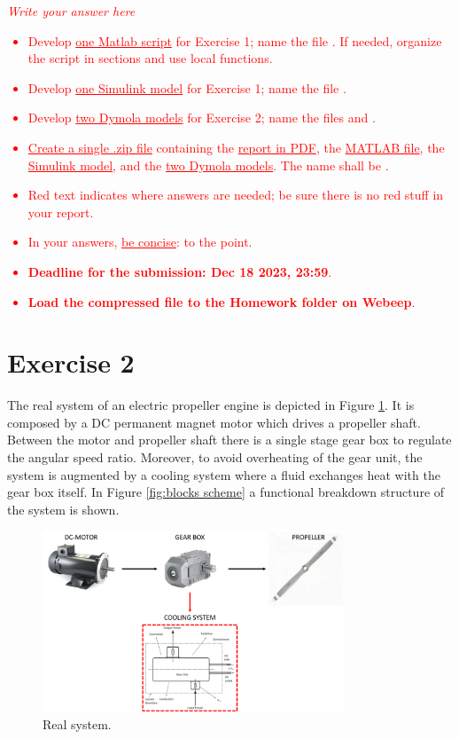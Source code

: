 \documentclass[11pt,a4paper,oneside]{article}
\newcommand{\tr}{\textcolor{red}}
\begin{document}
\tr{\textit{Write your answer here}}
\tr{
\begin{itemize}
\item Develop \underline{one Matlab script} for Exercise 1; name the file . If needed, organize the script in sections and use local functions. 
\item Develop \underline{one Simulink model} for Exercise 1; name the file . 
\item Develop \underline{two Dymola models} for Exercise 2; name the files  and  . 
\item \underline{Create a single .zip file} containing the \underline{report in PDF}, the \underline{MATLAB file}, the \underline{Simulink model}, and the \underline{two Dymola models}. The name shall be .
\item Red text indicates where answers are needed; be sure there is no red stuff in your report.
\item In your answers, \underline{be concise}: to the point.
\item \textbf{Deadline for the submission: Dec 18 2023, 23:59}.
\item \textbf{Load the compressed file to the Homework folder on Webeep}.
\end{itemize}
}

\section*{Exercise 2}
The real system of an electric propeller engine is depicted in Figure \ref{fig:propeller}. It is composed by a DC permanent magnet motor which drives a propeller shaft. Between the motor and propeller shaft there is a single stage gear box to regulate the angular speed ratio. Moreover, to avoid overheating of the gear unit, the system is augmented by a cooling system where a fluid exchanges heat with the gear box itself. In Figure \ref{fig:blocks scheme} a functional breakdown structure of the system is shown. 



\begin{figure}[h!]
\centering
\includegraphics[width=0.8\textwidth]{gfx/RealSystem_msas.png}
\caption{\label{fig:propeller} Real system.}
\end{figure}
\end{document}
